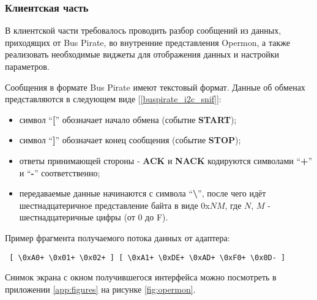 \subsubsection{Клиентская часть}

В клиентской части требовалось проводить разбор сообщений из данных, приходящих от Bus Pirate, во внутренние представления Opermon, а также реализовать необходимые виджеты для отображения данных и настройки параметров. 

Сообщения в формате Bus Pirate имеют текстовый формат. Данные об обменах представляются в следующем виде [\ref{buspirate_i2c_snif}]:

\begin{itemize}
 \item символ ``\textbf{[}'' обозначает начало обмена (событие \textbf{START});
 \item символ ``\textbf{]}'' обозначает конец сообщения (событие \textbf{STOP});
 \item ответы принимающей стороны - \textbf{ACK} и \textbf{NACK} кодируются символами ``\textbf{+}'' и ``\textbf{-}'' соответственно;
 \item передаваемые данные начинаются с символа ``\textbf{\textbackslash}'', после чего идёт шестнадцатеричное представление байта в виде 0x$NM$, где $N$, $M$ - шестнадцатеричные цифры (от 0 до F).
\end{itemize}

Пример фрагмента получаемого потока данных от адаптера:

\begin{verbatim}
 [ \0xA0+ \0x01+ \0x02+ ] [ \0xA1+ \0xDE+ \0xAD+ \0xF0+ \0x0D- ]
\end{verbatim}


Снимок экрана с окном получившегося интерфейса можно посмотреть в приложении \ref{app:figures} на рисунке \ref{fig:opermon}.